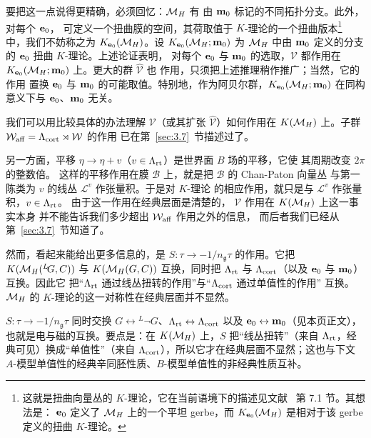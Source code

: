 要把这一点说得更精确，必须回忆：${{\mathcal{M}}_H}$ 有
由 ${\bf m}_0$ 标记的不同拓扑分支。此外，对每个 ${\bf e}_0$，
可定义一个扭曲膜的空间，其荷取值于
$K$-理论的一个扭曲版本\footnote{这就是扭曲向量丛的
$K$-理论，它在当前语境下的描述见文献~\cite{ref8} 第 7.1 节。其想法是：
${\bf e}_0$ 定义了 ${{\mathcal{M}}_H}$ 上的一个平坦 gerbe，而 $K_{{\bf e}_0}({{\mathcal{M}}_H})$ 是相对于该 gerbe
定义的扭曲 $K$-理论。}
 中，我们不妨称之为 $K_{{\bf e}_0}({{\mathcal{M}}_H})$。设 $K_{{\bf e}_0}({{\mathcal{M}}_H};{\bf m}_0)$ 为
${{\mathcal{M}}_H}$ 中由 ${\bf m}_0$ 定义的分支的 ${\bf e}_0$ 扭曲 $K$-理论。上述论证表明，
对每个 ${\bf e}_0$ 与 ${\bf m}_0$ 的选取，${\mathcal V}$
都作用在 $K_{{\bf e}_0}({{\mathcal{M}}_H};{\bf m}_0)$ 上。更大的群 $\hat {\mathcal V}$ 也
作用，只须把上述推理稍作推广；当然，它的作用
置换 ${\bf e}_0$ 与 ${\bf
m}_0$ 的可能取值。特别地，作为阿贝尔群，$K_{{\bf
e}_0}({{\mathcal{M}}_H};{\bf m}_0)$ 在同构意义下与 ${\bf e}_0$、${\bf
m}_0$ 无关。

我们可以用比较具体的办法理解 ${\mathcal V}$（或其扩张
$\hat{\mathcal V}$）如何作用在 $K({{\mathcal{M}}_H})$ 上。子群
${\mathcal W}_{\rm aff}=\Lambda_{{\rm cort}}\rtimes{\mathcal W}$ 的作用
已在第~\ref{sec:3.7}~节描述过了。

另一方面，平移 $\eta\to \eta+v$（$v\in
\Lambda_{\rm rt}$）是世界面 $B$ 场的平移，它使
其周期改变 $2\pi$ 的整数倍。
这样的平移作用在膜 $\mathcal
B$ 上，就是把 $\mathcal B$ 的 Chan-Paton 向量丛
与第一陈类为 $v$ 的线丛 ${\mathcal L}^v$ 作张量积。于是对 $K$-理论
的相应作用，就只是与 ${\mathcal L}^v$ 作张量积，$v\in \Lambda_{\rm rt}$。
由于这一作用在经典层面是清楚的，
$\mathcal V$ 作用在 $K({{\mathcal{M}}_H})$ 上这一事实本身
并不能告诉我们多少超出 ${\mathcal W}_{\rm aff}$ 作用之外的信息，
而后者我们已经从第~\ref{sec:3.7}~节知道了。

然而，看起来能给出更多信息的，是
$S:\tau\to -1/n_{\mathfrak g}\tau$ 的作用。它把 $K({{\mathcal{M}}_H}(^L\negthinspace G,C))$ 与
$K({{\mathcal{M}}_H}(G,C))$ 互换，同时把 $\Lambda_{\rm rt}$ 与
$\Lambda_{\rm cort}$（以及 ${\bf e}_0$ 与 ${\bf m}_0$）互换。因此它
把“$\Lambda_{\rm rt}$ 通过线丛扭转的作用”与“$\Lambda_{\rm cort}$ 通过单值性的作用”
互换。${{\mathcal{M}}_H}$ 的 $K$-理论的这一对称性在经典层面并不显然。

\begin{yizhu}[易错点]$S:\tau\to-1/n_{\mathfrak g}\tau$ 同时交换 $G\leftrightarrow{}^L\neg G$、$\Lambda_{\rm rt}\leftrightarrow\Lambda_{\rm cort}$ 以及 ${\bf e}_0\leftrightarrow{\bf m}_0$（见本页正文），也就是电与磁的互换。要点是：在 $K({{\mathcal{M}}_H})$ 上，$S$ 把“线丛扭转”（来自 $\Lambda_{\rm rt}$，经典可见）换成“单值性”（来自 $\Lambda_{\rm cort}$），所以它才在经典层面不显然；这也与下文 $A$-模型单值性的经典辛同胚性质、$B$-模型单值性的非经典性质互补。\end{yizhu}

